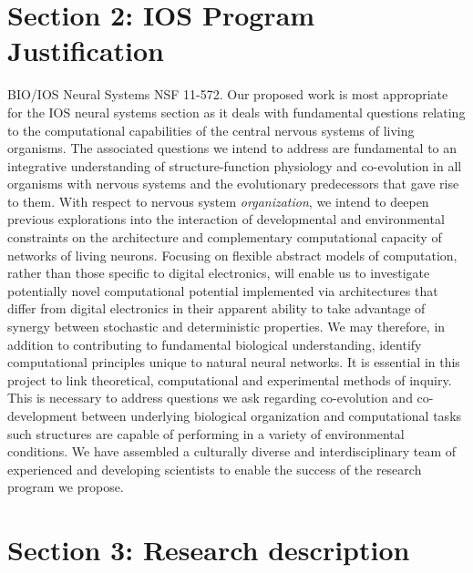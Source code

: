 \section{Section 2: IOS Program Justification}
\label{sec:justification}
\noindent BIO/IOS Neural Systems NSF 11-572. Our proposed work is most appropriate for the IOS neural systems section as it deals with fundamental questions relating to the computational capabilities of the central nervous systems of living organisms. The associated questions we intend to address are fundamental to an integrative understanding of structure-function physiology and co-evolution in all organisms with nervous systems and the evolutionary predecessors that gave rise to them. With respect to nervous system \emph{organization}, we intend to deepen previous explorations into the interaction of developmental and environmental constraints on the architecture and complementary computational capacity of networks of living neurons. Focusing on flexible abstract models of computation, rather than those specific to digital electronics, will enable us to investigate potentially novel computational potential implemented via architectures that differ from digital electronics in their apparent ability to take advantage of synergy between stochastic and deterministic properties. We may therefore, in addition to contributing to fundamental biological understanding, identify computational principles unique to natural neural networks. It is essential in this project to link theoretical, computational and experimental methods of inquiry. This is necessary to address questions we ask regarding co-evolution and co-development between underlying biological organization and computational tasks such structures are capable of performing in a variety of environmental conditions. We have assembled a culturally diverse and interdisciplinary team of experienced and developing scientists to enable the success of the research program we propose.

\section{Section 3: Research description}
\label{sec:description}

